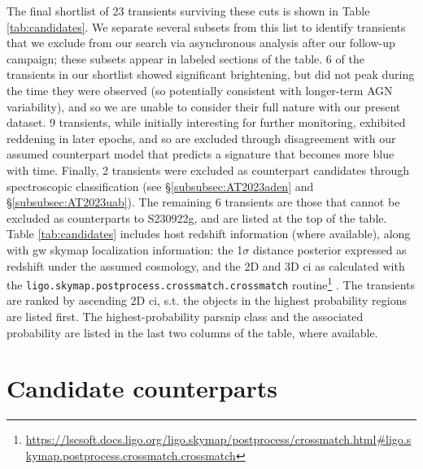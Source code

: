 \documentclass[twocolumn]{aastex631}
\newcommand{\gweventid}{S230922g\xspace}
\begin{document}
The final shortlist of 23 transients surviving these cuts is shown in Table \ref{tab:candidates}.
We separate several subsets from this list to identify transients that we exclude from our search via asynchronous analysis after our follow-up campaign; these subsets appear in labeled sections of the table.
6 of the transients in our shortlist showed significant brightening, but did not peak during the time they were observed (so potentially consistent with longer-term AGN variability), and so we are unable to consider their full nature with our present dataset.
9 transients, while initially interesting for further monitoring, exhibited reddening in later epochs, and so are excluded through disagreement with our assumed counterpart model that predicts a signature that becomes more blue with time.
Finally, 2 transients were excluded as counterpart candidates through spectroscopic classification (see \S\ref{subsubsec:AT2023aden} and \S\ref{subsubsec:AT2023uab}).
The remaining 6 transients are those that cannot be excluded as counterparts to \gweventid, and are listed at the top of the table.
Table \ref{tab:candidates} includes host redshift information (where available), along with \gls{gw} skymap localization information: the 1$\sigma$ distance posterior expressed as redshift under the assumed cosmology, and the 2D and 3D \gls{ci} as calculated with the \texttt{ligo.skymap.postprocess.crossmatch.crossmatch} routine\footnote{\url{https://lscsoft.docs.ligo.org/ligo.skymap/postprocess/crossmatch.html\#ligo.skymap.postprocess.crossmatch.crossmatch}} \citep{singerGoingDistanceMapping2016}.
The transients are ranked by ascending 2D \gls{ci}, s.t. the objects in the highest probability regions are listed first.
The highest-probability \gls{parsnip} class and the associated probability are listed in the last two columns of the table, where available.



\section{Candidate counterparts}
\label{sec:candidates}
\end{document}
